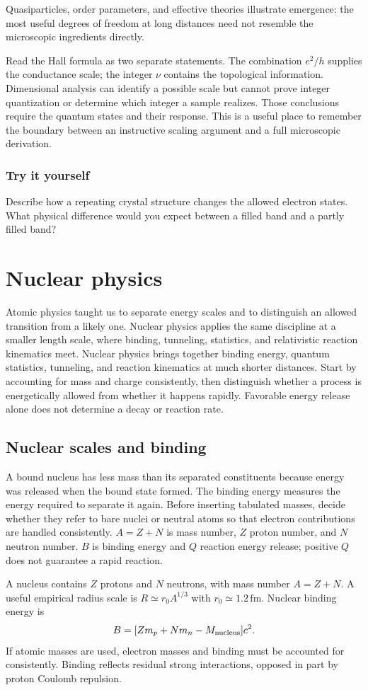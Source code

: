 \documentclass[11pt,oneside]{book}
\theoremstyle{reviewstyle}
\newcommand{\learningcheck}[1]{\subsection*{Try it yourself}\noindent #1\par}
\begin{document}
Quasiparticles, order parameters, and effective theories illustrate emergence: the most useful degrees of freedom at long distances need not resemble the microscopic ingredients directly.

Read the Hall formula as two separate statements. The combination $e^2/h$ supplies the conductance scale; the integer $\nu$ contains the topological information. Dimensional analysis can identify a possible scale but cannot prove integer quantization or determine which integer a sample realizes. Those conclusions require the quantum states and their response. This is a useful place to remember the boundary between an instructive scaling argument and a full microscopic derivation.

\learningcheck{Describe how a repeating crystal structure changes the allowed electron states. What physical difference would you expect between a filled band and a partly filled band?}

\chapter{Nuclear physics}
Atomic physics taught us to separate energy scales and to distinguish an allowed transition from a likely one. Nuclear physics applies the same discipline at a smaller length scale, where binding, tunneling, statistics, and relativistic reaction kinematics meet.
Nuclear physics brings together binding energy, quantum statistics, tunneling, and reaction kinematics at much shorter distances. Start by accounting for mass and charge consistently, then distinguish whether a process is energetically allowed from whether it happens rapidly. Favorable energy release alone does not determine a decay or reaction rate.

\section{Nuclear scales and binding}
A bound nucleus has less mass than its separated constituents because energy was released when the bound state formed. The binding energy measures the energy required to separate it again. Before inserting tabulated masses, decide whether they refer to bare nuclei or neutral atoms so that electron contributions are handled consistently. $A=Z+N$ is mass number, $Z$ proton number, and $N$ neutron number. $B$ is binding energy and $Q$ reaction energy release; positive $Q$ does not guarantee a rapid reaction.

A nucleus contains $Z$ protons and $N$ neutrons, with mass number $A=Z+N$. A useful empirical radius scale is $R\simeq r_0A^{1/3}$ with $r_0\simeq1.2\,\mathrm{fm}$. Nuclear binding energy is
\begin{equation}B=[Zm_p+Nm_n-M_{\rm nucleus}]c^2.\end{equation}
If atomic masses are used, electron masses and binding must be accounted for consistently. Binding reflects residual strong interactions, opposed in part by proton Coulomb repulsion.
\end{document}
